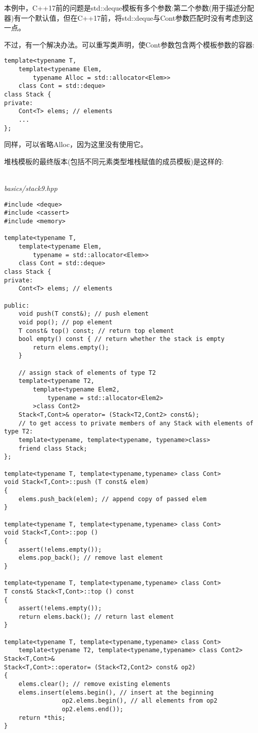 本例中，C++17前的问题是std::deque模板有多个参数:第二个参数(用于描述分配器)有一个默认值，但在C++17前，将std::deque与Cont参数匹配时没有考虑到这一点。

不过，有一个解决办法。可以重写类声明，使Cont参数包含两个模板参数的容器:

\begin{lstlisting}[style=styleCXX]
template<typename T,
	template<typename Elem,
		typename Alloc = std::allocator<Elem>>
	class Cont = std::deque>
class Stack {
private:
	Cont<T> elems; // elements
	...
};
\end{lstlisting}

同样，可以省略Alloc，因为这里没有使用它。

堆栈模板的最终版本(包括不同元素类型堆栈赋值的成员模板)是这样的:

\hspace*{\fill} \\ %
\noindent
\textit{basics/stack9.hpp}
\begin{lstlisting}[style=styleCXX]
#include <deque>
#include <cassert>
#include <memory>

template<typename T,
	template<typename Elem,
		typename = std::allocator<Elem>>
	class Cont = std::deque>
class Stack {
private:
	Cont<T> elems; // elements
	
public:
	void push(T const&); // push element
	void pop(); // pop element
	T const& top() const; // return top element
	bool empty() const { // return whether the stack is empty
		return elems.empty();
	}

	// assign stack of elements of type T2
	template<typename T2,
		template<typename Elem2,
			typename = std::allocator<Elem2>
		>class Cont2>
	Stack<T,Cont>& operator= (Stack<T2,Cont2> const&);
	// to get access to private members of any Stack with elements of type T2:
	template<typename, template<typename, typename>class>
	friend class Stack;
};

template<typename T, template<typename,typename> class Cont>
void Stack<T,Cont>::push (T const& elem)
{
	elems.push_back(elem); // append copy of passed elem
}

template<typename T, template<typename,typename> class Cont>
void Stack<T,Cont>::pop ()
{
	assert(!elems.empty());
	elems.pop_back(); // remove last element
}

template<typename T, template<typename,typename> class Cont>
T const& Stack<T,Cont>::top () const
{
	assert(!elems.empty());
	return elems.back(); // return last element
}

template<typename T, template<typename,typename> class Cont>
	template<typename T2, template<typename,typename> class Cont2>
Stack<T,Cont>&
Stack<T,Cont>::operator= (Stack<T2,Cont2> const& op2)
{
	elems.clear(); // remove existing elements
	elems.insert(elems.begin(), // insert at the beginning
				op2.elems.begin(), // all elements from op2
				op2.elems.end());
	return *this;
}
\end{lstlisting}

